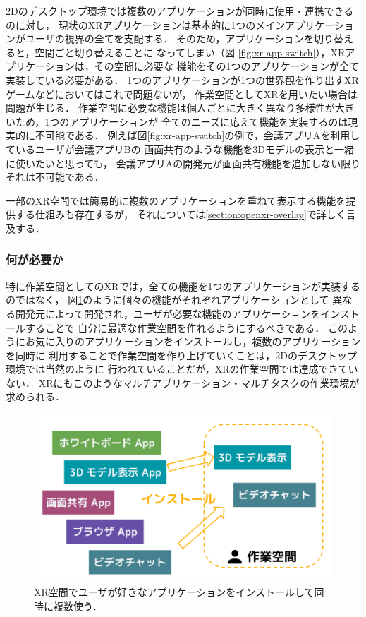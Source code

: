 2Dのデスクトップ環境では複数のアプリケーションが同時に使用・連携できるのに対し，
現状のXRアプリケーションは基本的に1つのメインアプリケーションがユーザの視界の全てを支配する．
そのため，アプリケーションを切り替えると，空間ごと切り替えることに
なってしまい（図 \ref{fig:xr-app-switch}），XRアプリケーションは，その空間に必要な
機能をその1つのアプリケーションが全て実装している必要がある．
1つのアプリケーションが1つの世界観を作り出すXRゲームなどにおいてはこれで問題ないが，
作業空間としてXRを用いたい場合は問題が生じる．
作業空間に必要な機能は個人ごとに大きく異なり多様性が大きいため，1つのアプリケーションが
全てのニーズに応えて機能を実装するのは現実的に不可能である．
例えば図\ref{fig:xr-app-switch}の例で，会議アプリAを利用しているユーザが会議アプリBの
画面共有のような機能を3Dモデルの表示と一緒に使いたいと思っても，
会議アプリAの開発元が画面共有機能を追加しない限りそれは不可能である．

一部のXR空間では簡易的に複数のアプリケーションを重ねて表示する機能を提供する仕組みも存在するが，
それについては\ref{section:openxr-overlay}で詳しく言及する．

\subsubsection{何が必要か}

特に作業空間としてのXRでは，全ての機能を1つのアプリケーションが実装するのではなく，
図\ref{fig:xr-app-install}のように個々の機能がそれぞれアプリケーションとして
異なる開発元によって開発され，ユーザが必要な機能のアプリケーションをインストールすることで
自分に最適な作業空間を作れるようにするべきである．
このようにお気に入りのアプリケーションをインストールし，複数のアプリケーションを同時に
利用することで作業空間を作り上げていくことは，2Dのデスクトップ環境では当然のように
行われていることだが，XRの作業空間では達成できていない．
XRにもこのようなマルチアプリケーション・マルチタスクの作業環境が求められる．

\begin{figure}[htbp]
  \begin{minipage}[t]{0.50\linewidth}
    \centering
    \includegraphics[keepaspectratio, width=\linewidth]{fig/xr-app-install.png}
    \caption{XR空間でユーザが好きなアプリケーションをインストールして同時に複数使う．}
    \label{fig:xr-app-install}
  \end{minipage}
\end{figure}
